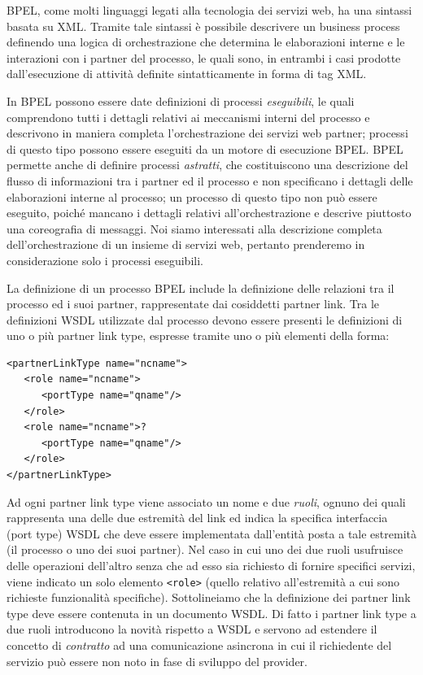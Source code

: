 BPEL, come molti linguaggi legati alla tecnologia dei servizi web, ha una
sintassi basata su XML. Tramite tale sintassi è possibile descrivere un business
process definendo una logica di orchestrazione che determina le elaborazioni
interne e le interazioni con i partner del processo, le quali sono, in entrambi
i casi prodotte dall’esecuzione di attività definite sintatticamente in forma di
tag XML.

In BPEL possono essere date definizioni di processi \emph{eseguibili}, le quali
comprendono  tutti i dettagli relativi ai meccanismi interni del processo e
descrivono in maniera completa l’orchestrazione dei servizi web partner; 
processi di questo tipo possono essere eseguiti da un motore di esecuzione BPEL. 
BPEL permette anche di definire processi \emph{astratti}, che costituiscono una
descrizione del flusso di informazioni tra i partner ed il processo e non
specificano i dettagli delle elaborazioni interne al processo; un processo
di questo tipo non può essere eseguito, poiché mancano i dettagli relativi     
all'orchestrazione e descrive piuttosto una coreografia di messaggi.
Noi siamo interessati alla descrizione completa dell'orchestrazione di un
insieme di servizi web, pertanto
prenderemo in considerazione solo i processi eseguibili.

La definizione di un processo BPEL include la definizione delle relazioni tra
il processo ed i suoi partner, rappresentate dai cosiddetti partner link. Tra le
definizioni WSDL utilizzate dal processo devono essere presenti le definizioni
di uno o più partner link type, espresse tramite uno o più elementi della
forma:

\begin{verbatim}
<partnerLinkType name="ncname">
   <role name="ncname">
      <portType name="qname"/>
   </role>
   <role name="ncname">?
      <portType name="qname"/>
   </role>
</partnerLinkType> 
\end{verbatim}

Ad ogni partner link type viene associato un nome e due \emph{ruoli}, ognuno dei
quali rappresenta una delle due estremità del link ed indica la specifica 
interfaccia (port type) WSDL che deve essere implementata dall'entità posta a
tale estremità (il processo o uno dei suoi partner). Nel caso in cui uno dei
due ruoli usufruisce delle operazioni dell'altro senza che ad esso sia richiesto
di fornire specifici servizi, viene indicato un solo elemento \texttt{<role>}
(quello relativo all'estremità a cui sono richieste funzionalità specifiche).
Sottolineiamo che  la definizione dei partner link type deve essere contenuta
in un documento WSDL. Di fatto i partner link type a due ruoli introducono la
novità rispetto a WSDL e servono ad estendere il concetto di
\emph{contratto} ad una comunicazione asincrona in cui il richiedente del
servizio può essere non noto in fase di sviluppo del provider.

